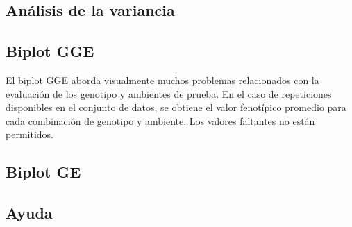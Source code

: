 \subsection{Análisis de la variancia}


\subsection{Biplot GGE}
El biplot GGE aborda visualmente muchos problemas relacionados con la evaluación de los genotipo y ambientes de prueba. En el caso de repeticiones disponibles en el conjunto de datos, se obtiene el valor fenotípico promedio para cada combinación de genotipo y ambiente. Los valores faltantes no están permitidos.


\subsection{Biplot GE}

\subsection{Ayuda}